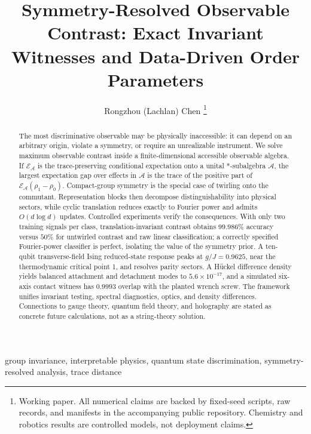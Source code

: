 \documentclass[letterpaper,journal]{IEEEtran}
\begin{document}
\title{Symmetry-Resolved Observable Contrast: Exact Invariant Witnesses and Data-Driven Order Parameters}

\author{Rongzhou (Lachlan) Chen%
\thanks{Working paper. All numerical claims are backed by fixed-seed scripts,
raw records, and manifests in the accompanying public repository. Chemistry
and robotics results are controlled models, not deployment claims.}}

\maketitle

\begin{abstract}
The most discriminative observable may be physically inaccessible: it can
depend on an arbitrary origin, violate a symmetry, or require an unrealizable
instrument. We solve maximum observable contrast inside a
finite-dimensional accessible observable algebra. If
$\mathcal E_{\mathcal A}$ is the trace-preserving conditional expectation
onto a unital $*$-subalgebra $\mathcal A$, the largest expectation gap over
effects in $\mathcal A$ is the trace of the positive part of
$\mathcal E_{\mathcal A}(\rho_1-\rho_0)$. Compact-group symmetry is the
special case of twirling onto the commutant. Representation blocks then
decompose distinguishability into physical sectors, while cyclic translation
reduces exactly to Fourier power and admits $O(d\log d)$ updates. Controlled
experiments verify the consequences. With only two training signals per
class, translation-invariant contrast obtains $99.986\%$ accuracy versus
$50\%$ for untwirled contrast and raw linear classification; a correctly
specified Fourier-power classifier is perfect, isolating the value of the
symmetry prior. A ten-qubit transverse-field Ising reduced-state response
peaks at $g/J=0.9625$, near the thermodynamic critical point 1, and resolves
parity sectors. A H{\"u}ckel difference density yields balanced attachment and
detachment modes to $5.6\times10^{-17}$, and a simulated six-axis contact
witness has $0.9993$ overlap with the planted wrench screw. The framework
unifies invariant testing, spectral diagnostics, optics, and density
differences. Connections to gauge theory, quantum field theory, and
holography are stated as concrete future calculations, not as a string-theory
solution.
\end{abstract}

\begin{IEEEkeywords}
group invariance, interpretable physics, quantum state discrimination,
symmetry-resolved analysis, trace distance
\end{IEEEkeywords}
\end{document}
